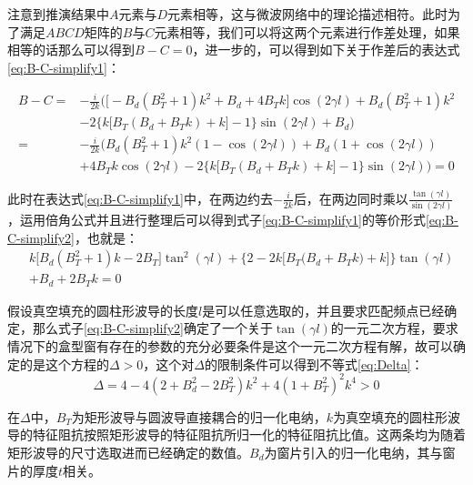 \documentclass[master]{thesis-uestc}
\begin{document}
注意到推演结果中$A$元素与$D$元素相等，这与微波网络中的理论描述相符。此时为了满足$ABCD$矩阵的$B$与$C$元素相等，我们可以将这两个元素进行作差处理，如果相等的话那么可以得到$B-C=0$，进一步的，可以得到如下关于作差后的表达式\ref{eq:B-C-simplify1}：

\begin{equation}\label{eq:B-C-simplify1}
    \begin{split}
        B - C = & -\frac{i}{2k} \Bigg( \Big[-B_{d}(B_{T}^2 + 1)k^2 + B_{d} + 4B_{T}k\Big]\cos(2\gamma l) 
                  + B_{d}(B_{T}^2 + 1)k^2 \\
                & - 2\Big\{k\big[B_{T}(B_{d} + B_{T}k) + k\big] - 1\Big\}\sin(2\gamma l) 
                  + B_{d} \Bigg) \\
                = & -\frac{i}{2k} \Bigg(B_{d}(B_{T}^2 + 1)k^2(1-\cos(2\gamma l)) + B_{d}(1+\cos(2\gamma l)) \\
                & +4B_{T}k\cos(2\gamma l) - 2\Big\{k\big[B_{T}(B_{d} + B_{T}k) + k\big] - 1\Big\}\sin(2\gamma l) \Bigg) = 0
    \end{split}
\end{equation}

此时在表达式\ref{eq:B-C-simplify1}中，在两边约去$-\frac{i}{2k} $后，在两边同时乘以$\frac{\tan(\gamma l)}{\sin(2 \gamma l)}$，运用倍角公式并且进行整理后可以得到式子\ref{eq:B-C-simplify1}的等价形式\ref{eq:B-C-simplify2}，也就是：
\begin{equation}\label{eq:B-C-simplify2}
    \begin{split}
     & k \big[B_{d}(B_{T}^2+1)k - 2B_{T}\big]\tan^2(\gamma l) 
       + \Big\{ 2- 2k\Big[B_{T}\big(B_{d} + B_{T}k\big) + k\Big] \Big\}\tan(\gamma l) \\
    & + B_{d} + 2B_{T}k = 0
    \end{split}
\end{equation}

假设真空填充的圆柱形波导的长度$l$是可以任意选取的，并且要求匹配频点已经确定，那么式子\ref{eq:B-C-simplify2}确定了一个关于$\tan(\gamma l)$的一元二次方程，要求情况下的盒型窗有存在的参数的充分必要条件是这个一元二次方程有解，故可以确定的是这个方程的$\Delta >0$，这个对$\Delta$的限制条件可以得到不等式\ref{eq:Delta}：
\begin{equation}\label{eq:Delta}
    \Delta = 4 - 4 (2 + B_{d}^2 - 2 B_{T}^2) k^2 + 4 (1 + B_{T}^2)^2 k^4>0
\end{equation}

在$\Delta$中，$B_{T}$为矩形波导与圆波导直接耦合的归一化电纳，$k$为真空填充的圆柱形波导的特征阻抗按照矩形波导的特征阻抗所归一化的特征阻抗比值。这两条均为随着矩形波导的尺寸选取进而已经确定的数值。$B_{d}$为窗片引入的归一化电纳，其与窗片的厚度$t$相关。
\end{document}
